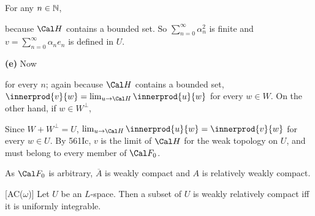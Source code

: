 {For any $n\in\Bbb N$,


\noindent because $\Cal H$ contains a bounded set.   So
$\sum_{n=0}^{\infty}\alpha_n^2$ is finite and
$v=\sum_{n=0}^{\infty}\alpha_ne_n$ is defined in $U$.

\medskip

{\bf (e)} Now


\noindent for every $n$;  again because $\Cal H$ contains a bounded set,
$\innerprod{v}{w}=\lim_{u\to\Cal H}\innerprod{u}{w}$ for every $w\in W$.
On the other hand, if $w\in W^{\perp}$,


\noindent Since $W+W^{\perp}=U$,
$\lim_{u\to\Cal H}\innerprod{u}{w}=\innerprod{v}{w}$ for every $w\in U$.
By 561Ic, $v$ is the limit of $\Cal H$ for the weak topology on $U$,
and must belong to every member of $\Cal F_0$.

As $\Cal F_0$ is arbitrary, $\overline{A}$ is weakly
compact and $A$ is relatively weakly compact.
}%

 [AC($\omega$)]
Let $U$ be an $L$-space.   Then a subset of $U$ is weakly relatively
compact iff it is uniformly integrable.

